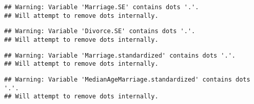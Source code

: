 \documentclass[]{article}
\begin{document}
\begin{verbatim}
## Warning: Variable 'Marriage.SE' contains dots '.'.
## Will attempt to remove dots internally.
\end{verbatim}

\begin{verbatim}
## Warning: Variable 'Divorce.SE' contains dots '.'.
## Will attempt to remove dots internally.
\end{verbatim}

\begin{verbatim}
## Warning: Variable 'Marriage.standardized' contains dots '.'.
## Will attempt to remove dots internally.
\end{verbatim}

\begin{verbatim}
## Warning: Variable 'MedianAgeMarriage.standardized' contains dots '.'.
## Will attempt to remove dots internally.
\end{verbatim}
\end{document}
